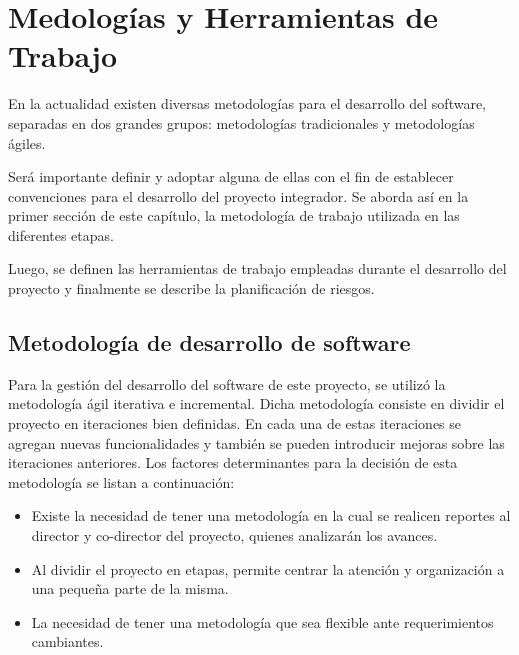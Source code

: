 
\chapter{Medologías y Herramientas de Trabajo} %

\label{Chapter5} %
En la actualidad existen diversas metodologías para el desarrollo del software, separadas en dos grandes grupos: metodologías tradicionales y metodologías ágiles. 

Será importante definir y adoptar alguna de ellas con el fin de establecer convenciones para el desarrollo del proyecto integrador. Se aborda así en la primer sección de este capítulo, la metodología de trabajo utilizada en las diferentes etapas.

Luego, se definen las herramientas de trabajo empleadas durante el desarrollo del proyecto y finalmente se describe la planificación de riesgos.


\section{Metodología de desarrollo de software}
Para la gestión del desarrollo del software de este proyecto, se utilizó la metodología ágil iterativa e incremental. Dicha metodología consiste en dividir el proyecto en iteraciones bien definidas. En cada una de estas iteraciones se agregan nuevas funcionalidades y también se pueden introducir mejoras sobre las iteraciones anteriores. Los factores determinantes para la decisión de esta metodología se listan a continuación:

\begin{itemize}
	\item Existe la necesidad de tener una metodología en la cual se realicen reportes al director y co-director del proyecto, quienes analizarán los avances.
	\item Al dividir el proyecto en etapas, permite centrar la atención y organización a una pequeña parte de la misma.
	\item La necesidad de tener una metodología que sea flexible ante requerimientos cambiantes.
\end{itemize}

